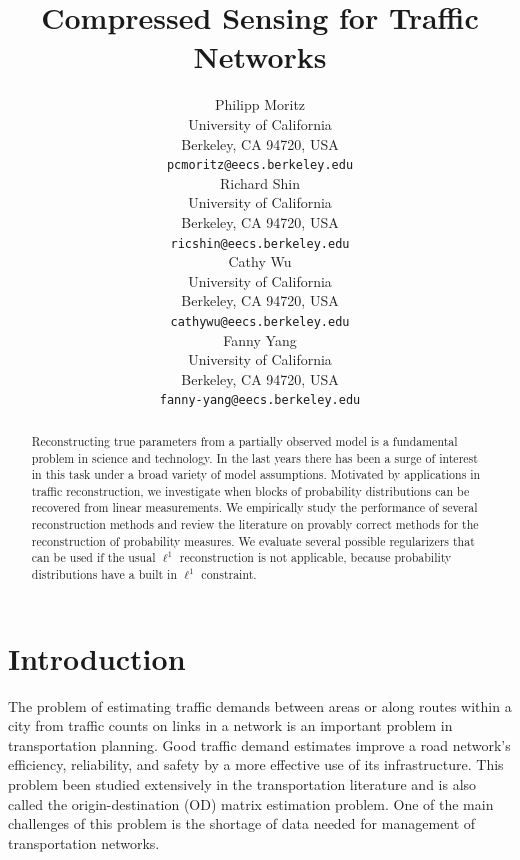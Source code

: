\documentclass{article} %
\begin{document}
\title{Compressed Sensing for Traffic Networks}

\author{
Philipp Moritz\\
University of California\\
Berkeley, CA 94720, USA\\
\texttt{pcmoritz@eecs.berkeley.edu}\\
\And
Richard Shin\\
University of California\\
Berkeley, CA 94720, USA\\
\texttt{ricshin@eecs.berkeley.edu}\\
\And
Cathy Wu\\
University of California\\
Berkeley, CA 94720, USA\\
\texttt{cathywu@eecs.berkeley.edu}\\
\And
Fanny Yang\\
University of California\\
Berkeley, CA 94720, USA\\
\texttt{fanny-yang@eecs.berkeley.edu} \\
}

\maketitle

\begin{abstract}
Reconstructing true parameters from a partially observed model is a fundamental problem in science and technology.
In the last years there has been a surge of interest in this task under a broad variety of model assumptions.
Motivated by applications in traffic reconstruction, we investigate when blocks of probability distributions can be recovered from linear measurements.
We empirically study the performance of several reconstruction methods and review the literature on provably correct methods for the reconstruction of probability measures.
We evaluate several possible regularizers that can be used if the usual $\ell^1$ reconstruction is not applicable, because probability distributions have a built in $\ell^1$ constraint.
\end{abstract}

\section{Introduction}
The problem of estimating traffic demands between areas or along routes within a city from traffic counts on links in a network is an important problem in transportation planning. Good traffic demand estimates improve a road network's efficiency, reliability, and safety by a more effective use of its infrastructure. This problem been studied extensively in the transportation literature and is also called the origin-destination (OD) matrix estimation problem. One of the main challenges of this problem is the shortage of data needed for management of transportation networks. 
\end{document}
